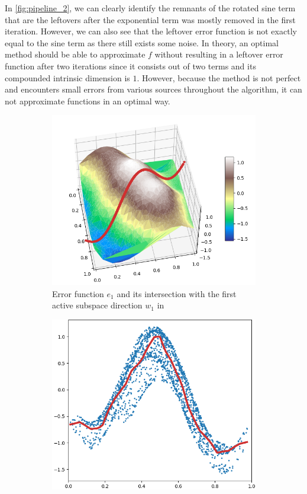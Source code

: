 \documentclass[
  a4paper,  %
  twoside,  %
  bibliography=totoc,
  headsepline,
  cleardoublepage=empty,
  parskip=half,
  draft=false
]{scrbook}
\begin{document}
%
In \cref{fig:pipeline_2}, we can clearly identify the remnants of the rotated sine term that are the leftovers after the exponential term was mostly removed in the first iteration.
However, we can also see that the leftover error function is not exactly equal to the sine term as there still exists some noise.
In theory, an optimal method should be able to approximate $f$ without resulting in a leftover error function after two iterations since it consists out of two terms and its compounded intrinsic dimension is $1$.
However, because the method is not perfect and encounters small errors from various sources throughout the algorithm, it can not approximate functions in an optimal way.
\begin{mdframed}[style=style]
\begin{figure}[H]
\begin{subfigure}{.5\textwidth}
  \centering
  \includegraphics[width=.8\linewidth]{graphics/pipeline_current_2.png}
  \caption{Error function $e_1$ and its intersection with the first active subspace direction $w_1$ in \reddot}
\label{fig:pipeline_current_2}
\end{subfigure}%
\begin{subfigure}{.5\textwidth}
  \centering
  \includegraphics[width=.8\linewidth]{graphics/pipeline_local_2.png}

\end{subfigure}
\end{figure}
\end{mdframed}
\end{document}
